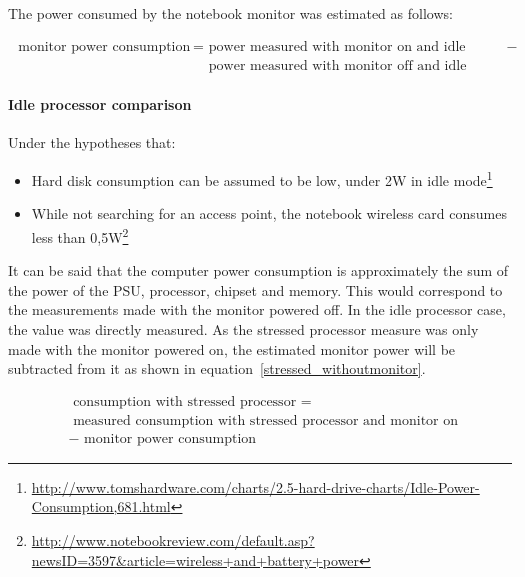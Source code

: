             The power consumed by the notebook monitor was estimated as follows: 
            
            \begin{equation}
                \begin{split}
                    \text{ monitor power consumption } =& \text{ power measured with monitor on and idle processor } -  \\
                    & \text{ power measured with monitor off and idle processor }  
                \end{split}
                \label{monitor_consumption}
            \end{equation}
            
        \paragraph*{Idle processor comparison}
            Under the hypotheses that: 
            
        \begin{itemize}
            \item Hard disk consumption can be assumed to be low, under 2W in idle mode\footnote{\url{http://www.tomshardware.com/charts/2.5-hard-drive-charts/Idle-Power-Consumption,681.html}}
            \item While not searching for an access point, the notebook wireless card consumes less than 0,5W\footnote{\url{http://www.notebookreview.com/default.asp?newsID=3597&article=wireless+and+battery+power}}
        \end{itemize}
        
            It can be said that the computer power consumption is approximately the sum of the power of the PSU, processor, chipset and memory. This would correspond to the measurements made with the monitor powered off. In the idle processor case, the value was directly measured. As the stressed processor measure was only made with the monitor powered on, the estimated monitor power will be subtracted from it as shown in equation~\ref{stressed_withoutmonitor}.
            
            \begin{equation}
                \begin{split}
                &\text{ consumption with stressed processor } = \\
                &\text{ measured consumption with stressed processor and monitor on } \\
                &-\text{ monitor power consumption }
                \end{split}
                \label{stressed_withoutmonitor}
            \end{equation}
            
